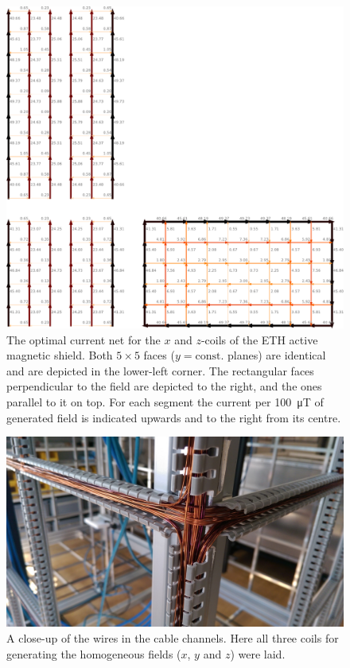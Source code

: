 \begin{figure}
  \centering
  \includegraphics[width=0.9\linewidth]{gfx/prototype/coil_design_x_100uT.pdf}
  \caption{The optimal current net for the $x$ and $z$-coils of the ETH active magnetic shield. Both $5 \times 5$ faces ($y = \mathrm{const.}$ planes) are identical and are depicted in the lower-left corner. The rectangular faces perpendicular to the field are depicted to the right, and the ones parallel to it on top. For each segment the current per \SI{100}{\micro\tesla} of generated field is indicated upwards and to the right from its centre.}\label{fig:prototype_coil_x_z_currents}
\end{figure}

\begin{figure}
  \centering
  \includegraphics[width=0.9\linewidth]{gfx/prototype/wires_close_up.jpg}
  \caption{A close-up of the wires in the cable channels. Here all three coils for generating the homogeneous fields ($x$, $y$ and $z$) were laid.}\label{fig:prototype_coil_wire_close-up}
\end{figure}


